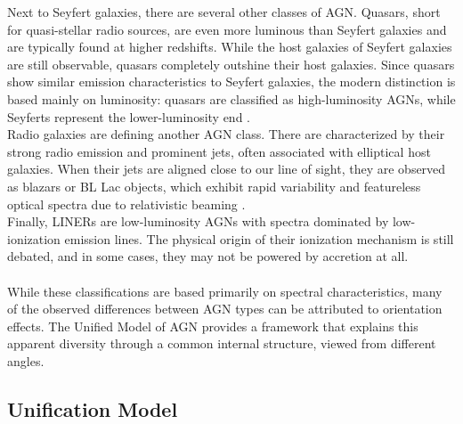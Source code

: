 Next to Seyfert galaxies, there are several other classes of AGN. Quasars, short for quasi-stellar radio sources, are even more luminous than Seyfert galaxies and are typically found at higher redshifts. While the host galaxies of Seyfert galaxies are still observable, quasars completely outshine their host galaxies. Since quasars show similar emission characteristics to Seyfert galaxies, the modern distinction is based mainly on luminosity: quasars are classified as high-luminosity AGNs, while Seyferts represent the lower-luminosity end \parencite{netzer2013agn}.\\
Radio galaxies are defining another AGN class. There are characterized by their strong radio emission and prominent jets, often associated with elliptical host galaxies. When their jets are aligned close to our line of sight, they are observed as blazars or BL Lac objects, which exhibit rapid variability and featureless optical spectra due to relativistic beaming \parencite{netzer2013agn}.\\
Finally, LINERs are low-luminosity AGNs with spectra dominated by low-ionization emission lines. The physical origin of their ionization mechanism is still debated, and in some cases, they may not be powered by accretion at all\parencite{netzer2013agn}.\\\\
While these classifications are based primarily on spectral characteristics, many of the observed differences between AGN types can be attributed to orientation effects. The Unified Model of AGN provides a framework that explains this apparent diversity through a common internal structure, viewed from different angles.

\subsection{Unification Model}
\label{sec:unification_model}

